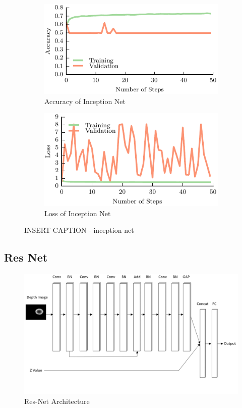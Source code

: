 \begin{figure}[t!]
    \centering
    \begin{subfigure}[t]{0.49\textwidth}
        \includegraphics[width=0.9\columnwidth]{figs/inception_accuracy.pdf}
        \caption{Accuracy of Inception Net} \label{fig:accuracy}
        \end{subfigure}
    \begin{subfigure}[t]{0.49\textwidth}
        \includegraphics[width=0.9\columnwidth]{figs/inception_loss.pdf}
        \caption{Loss of Inception Net} \label{fig:loss_inception}
    \end{subfigure}
\caption{INSERT CAPTION - inception net} \label{fig:inceptionnet_results}
\end{figure}


\subsection{Res Net}

\begin{figure}[t!]
    \includegraphics[width=0.99\columnwidth]{figs/res_net.png}
\caption{Res-Net Architecture} \label{fig:res_net}
\end{figure}


